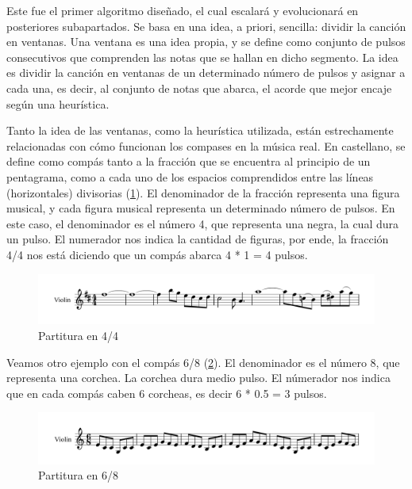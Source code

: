     Este fue el primer algoritmo diseñado, el cual escalará y evolucionará en posteriores subapartados. Se basa en una idea, a priori, sencilla: dividir la canción en ventanas. Una ventana es una idea propia, y se define como conjunto de pulsos consecutivos que comprenden las notas que se hallan en dicho segmento. La idea es dividir la canción en ventanas de un determinado número de pulsos y asignar a cada una, es decir, al conjunto de notas que abarca, el acorde que mejor encaje según una heurística.

    Tanto la idea de las ventanas, como la heurística utilizada, están estrechamente relacionadas con cómo funcionan los compases en la música real. En castellano, se define como compás tanto a la fracción que se encuentra al principio de un pentagrama, como a cada uno de los espacios comprendidos entre las líneas (horizontales) divisorias (\ref{fig:sheet4/4}). El denominador de la fracción representa una figura musical, y cada figura musical representa un determinado número de pulsos. En este caso, el denominador es el número 4, que representa una negra, la cual dura un pulso. El numerador nos indica la cantidad de figuras, por ende, la fracción 4/4 nos está diciendo que un compás abarca 4 * 1 = 4 pulsos. 

\begin{figure}[h]
    \begin{center}
        \includegraphics[scale=0.65]{Imagenes/Bitmap/partitura.png}
    \end{center}
    \caption{Partitura en 4/4}
    \label{fig:sheet4/4}
\end{figure}

    Veamos otro ejemplo con el compás 6/8 (\ref{fig:sheet6/8}). El denominador es el número 8, que representa una corchea. La corchea dura medio pulso. El númerador nos indica que en cada compás caben 6 corcheas, es decir 6 * 0.5 = 3 pulsos.

\begin{figure}[h]
    \begin{center}
        \includegraphics[scale=0.65]{Imagenes/Bitmap/partitura2.png}
    \end{center}
    \caption{Partitura en 6/8}
    \label{fig:sheet6/8}
\end{figure}

